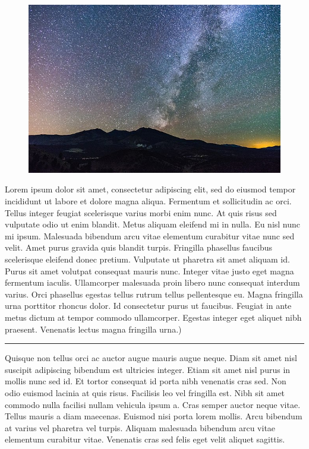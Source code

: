 \documentclass[10pt]{article} %
\newcommand*{\noind}{\setlength{\parindent}{0cm}} %
\newcommand{\medhdr}[1][]{%
	{\noind{\Large\bfseries\headingfont{#1}}}
	\vspace{-9pt}

	\noindent\rule{2.75in}{2pt} %
}
\begin{document}
\begin{multicols}{2}
  \begin{figure}[ht] %
    \centering
    \includegraphics[width=\textwidth]{universe.jpg} 
  \end{figure}

  Lorem ipsum dolor sit amet, consectetur adipiscing elit, sed do eiusmod tempor incididunt ut labore et dolore magna aliqua. Fermentum et sollicitudin ac orci. Tellus integer feugiat scelerisque varius morbi enim nunc. At quis risus sed vulputate odio ut enim blandit. Metus aliquam eleifend mi in nulla. Eu nisl nunc mi ipsum. Malesuada bibendum arcu vitae elementum curabitur vitae nunc sed velit. Amet purus gravida quis blandit turpis. Fringilla phasellus faucibus scelerisque eleifend donec pretium. Vulputate ut pharetra sit amet aliquam id. Purus sit amet volutpat consequat mauris nunc. Integer vitae justo eget magna fermentum iaculis. Ullamcorper malesuada proin libero nunc consequat interdum varius. Orci phasellus egestas tellus rutrum tellus pellentesque eu. Magna fringilla urna porttitor rhoncus dolor. Id consectetur purus ut faucibus. Feugiat in ante metus dictum at tempor commodo ullamcorper. Egestas integer eget aliquet nibh praesent. Venenatis lectus magna fringilla urna.)\\

  \medhdr[SMALL SECTION] %
  {\noind
    Quisque non tellus orci ac auctor augue mauris augue neque. Diam sit amet nisl suscipit adipiscing bibendum est ultricies integer. Etiam sit amet nisl purus in mollis nunc sed id. Et tortor consequat id porta nibh venenatis cras sed. Non odio euismod lacinia at quis risus. Facilisis leo vel fringilla est. Nibh sit amet commodo nulla facilisi nullam vehicula ipsum a. Cras semper auctor neque vitae. Tellus mauris a diam maecenas. Euismod nisi porta lorem mollis. Arcu bibendum at varius vel pharetra vel turpis. Aliquam malesuada bibendum arcu vitae elementum curabitur vitae. Venenatis cras sed felis eget velit aliquet sagittis.\\
  }



\end{multicols}
\end{document}
